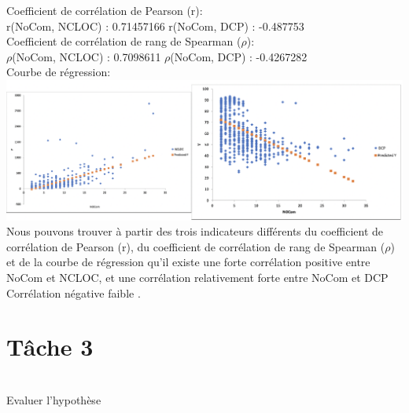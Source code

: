 \documentclass{article}
\begin{document}
Coefficient de corrélation de Pearson (r):\\

r(NoCom, NCLOC) : 0.71457166 \qquad r(NoCom, DCP) : -0.487753\\

Coefficient de corrélation de rang de Spearman ($\rho$):\\

$\rho$(NoCom, NCLOC) : 0.7098611 \qquad $\rho$(NoCom, DCP) : -0.4267282\\

Courbe de régression:\\
\includegraphics[scale=0.55]{T2.png}\\
Nous pouvons trouver à partir des trois indicateurs différents du coefficient de corrélation de Pearson (r), du coefficient de corrélation de rang de Spearman ($\rho$) et de la courbe de régression qu'il existe une forte corrélation positive entre NoCom et NCLOC, et une corrélation relativement forte entre NoCom et DCP Corrélation négative faible .





\section*{Tâche 3}\\
Evaluer l’hypothèse
\end{document}
